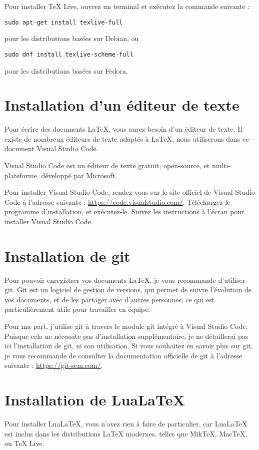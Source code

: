 \documentclass[../main.tex]{subfiles}
\begin{document}
Pour installer TeX Live, ouvrez un terminal et exécutez la commande suivante :
\begin{verbatim}
sudo apt-get install texlive-full
\end{verbatim}
pour les distributions basées sur Debian, ou
\begin{verbatim}
sudo dnf install texlive-scheme-full
\end{verbatim}
pour les distributions basées sur Fedora.

\section{Installation d'un éditeur de texte}

Pour écrire des documents \LaTeX{}, vous aurez besoin d'un éditeur de texte. Il existe de nombreux éditeurs de texte adaptés à \LaTeX{}, nous utiliserons dans ce document Visual Studio Code.

Visual Studio Code est un éditeur de texte gratuit, open-source, et multi-plateforme, développé par Microsoft.

Pour installer Visual Studio Code, rendez-vous sur le site officiel de Visual Studio Code à l'adresse suivante : \url{https://code.visualstudio.com/}. Téléchargez le programme d'installation, et exécutez-le. Suivez les instructions à l'écran pour installer Visual Studio Code.

\section{Installation de git}

Pour pouvoir enregistrer vos documents \LaTeX{}, je vous recommande d'utiliser git. Git est un logiciel de gestion de versions, qui permet de suivre l'évolution de vos documents, et de les partager avec d'autres personnes, ce qui est particulièrement utile pour travailler en équipe.

Pour ma part, j'utilise git à travers le module git intégré à Visual Studio Code. Puisque cela ne nécessite pas d'installation supplémentaire, je ne détaillerai pas ici l'installation de git, ni son utilisation. Si vous souhaitez en savoir plus sur git, je vous recommande de consulter la documentation officielle de git à l'adresse suivante : \url{https://git-scm.com/}.

\section{Installation de Lua\LaTeX{}}

Pour installer Lua\LaTeX{}, vous n'avez rien à faire de particulier, car Lua\LaTeX{} est inclus dans les distributions \LaTeX{} modernes, telles que Mik\TeX{}, Mac\TeX{}, ou TeX Live.
\end{document}
